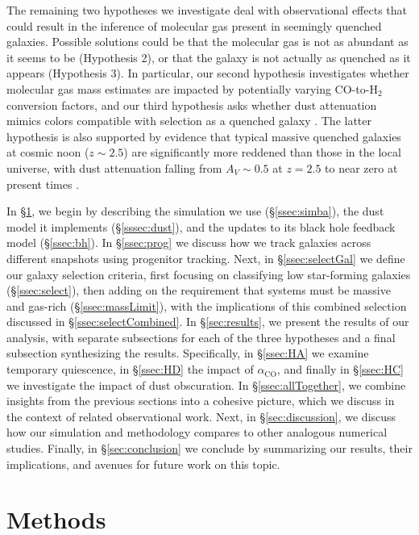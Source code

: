 \documentclass[twocolumn, linenumbers]{aastex631}
\newcommand{\aco}{\alpha_\text{CO}}
\begin{document}
The remaining two hypotheses we investigate deal with observational effects that could result in the inference of molecular gas present in seemingly quenched galaxies.  Possible solutions could be that the molecular gas is not as abundant as it seems to be (Hypothesis 2), or that the galaxy is not actually as quenched as it appears (Hypothesis 3).  In particular, our second hypothesis investigates whether molecular gas mass estimates are impacted by potentially varying CO-to-H$_2$ conversion factors, and our third hypothesis asks whether dust attenuation mimics colors compatible with selection as a quenched galaxy \citep{uvj, Baron2023, psbEagle, cenci25}.  The latter hypothesis is also supported by evidence that typical massive quenched galaxies at cosmic noon ($z\sim 2.5$) are significantly more reddened than those in the local universe, with dust attenuation falling from $A_V\sim 0.5$ at $z=2.5$ to near zero at present times \citep{siegel24}. 

In \S\ref{sec:methods}, we begin by describing the simulation we use (\S\ref{ssec:simba}), the dust model it implements (\S\ref{sssec:dust}), and the updates to its black hole feedback model (\S\ref{ssec:bh}).  In \S\ref{ssec:prog} we discuss how we track galaxies across different snapshots using progenitor tracking.  Next, in \S\ref{ssec:selectGal} we define our galaxy selection criteria, first focusing on classifying low star-forming galaxies (\S\ref{ssec:select}), then adding on the requirement that systems must be massive and gas-rich (\S\ref{ssec:massLimit}), with the implications of this combined selection discussed in \S\ref{ssec:selectCombined}.  In \S\ref{sec:results}, we present the results of our analysis, with separate subsections for each of the three hypotheses and a final subsection synthesizing the results.  Specifically, in \S\ref{ssec:HA} we examine temporary quiescence, in \S\ref{ssec:HD} the impact of $\aco$, and finally in \S\ref{ssec:HC} we investigate the impact of dust obscuration.  In \S\ref{ssec:allTogether}, we combine insights from the previous sections into a cohesive picture, which we discuss in the context of related observational work.  Next, in \S\ref{sec:discussion}, we discuss how our simulation and methodology compares to other analogous numerical studies.  Finally, in \S\ref{sec:conclusion} we conclude by summarizing our results, their implications, and avenues for future work on this topic.

\section{Methods}
\label{sec:methods}
\end{document}
